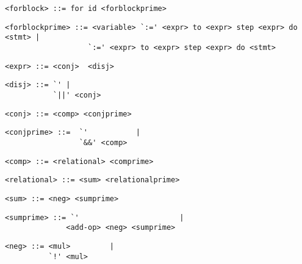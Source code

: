 \begin{footnotesize}
\begin{lstlisting}[frame=single, label={forblock}, language=pie]
<forblock> ::= for id <forblockprime>
\end{lstlisting}

\begin{lstlisting}[frame=single, label={forblockprime}, language=pie]
<forblockprime> ::= <variable> `:=' <expr> to <expr> step <expr> do <stmt> |
                   `:=' <expr> to <expr> step <expr> do <stmt>
\end{lstlisting}

\begin{lstlisting}[frame=single, label={expr}, language=pie]
<expr> ::= <conj>  <disj>
\end{lstlisting}

\begin{lstlisting}[frame=single, label={disj}, language=pie]
<disj> ::= `' |
           `||' <conj>
\end{lstlisting}

\begin{lstlisting}[frame=single, label={conj}, language=pie]
<conj> ::= <comp> <conjprime>
\end{lstlisting}

\begin{lstlisting}[frame=single, label={conjprime}, language=pie]
<conjprime> ::=  `'           | 
                 `&&' <comp>
\end{lstlisting}

\begin{lstlisting}[frame=single, label={comp}, language=pie]
<comp> ::= <relational> <comprime>
\end{lstlisting}

\begin{lstlisting}[frame=single, label={relational}, language=pie]
<relational> ::= <sum> <relationalprime>
\end{lstlisting}

\begin{lstlisting}[frame=single, label={sum}, language=pie]
<sum> ::= <neg> <sumprime>
\end{lstlisting}

\begin{lstlisting}[frame=single, label={sumprime}, language=pie]
<sumprime> ::= `'                       | 
              <add-op> <neg> <sumprime>
\end{lstlisting}

\begin{lstlisting}[frame=single, label={neg}, language=pie]
<neg> ::= <mul>         | 
          `!' <mul>
\end{lstlisting}


\end{footnotesize}
